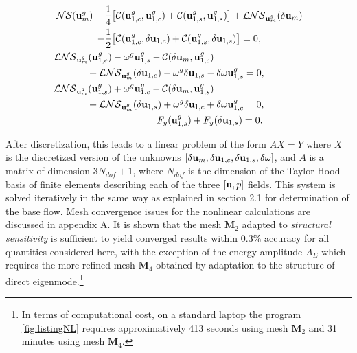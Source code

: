 \documentclass[twocolumn,10pt]{asme2ej}
\begin{document}
\begin{subequations}

\begin{align}
{\cal NS}(  {\bf u }_m^g ) - \frac{1}{4} &\big[ {\cal C}( {\bf u }_{1,c}^g,{\bf u }_{1,c}^g) +  {\cal C}( {\bf u }_{1,s}^g,{\bf u }_{1,s}^g) \big]+ {\cal LNS}_{{\bf u }_m^g}(\delta {\bf u }_m) \nonumber \\
-\frac{1}{2}& \big[ {\cal C}( {\bf u }_{1,c}^g,\delta {\bf u }_{1,c}) +  {\cal C}( {\bf u }_{1,s}^g,\delta {\bf u }_{1,s}) \big] = 0, \label{HB_1} \\
{\cal LNS}_{{\bf u }_m^g}( {\bf u }_{1,c}^g)& - \omega^g {\bf u }_{1,s}^g -  {\cal C}( \delta {\bf u }_{m}, {\bf u }_{1,c}^g) \nonumber \\
&\hspace{-0.9cm}+{\cal LNS}_{{\bf u }_m^g}( \delta {\bf u }_{1,c})  - \omega^g \delta {\bf u }_{1,s}  
 - \delta \omega {\bf u }_{1,s}^g = 0 , \label{HB_2}\\
{\cal LNS}_{{\bf u }_m^g}({\bf u }_{1,s}^g)& + \omega^g {\bf u }_{1,c}^g -  {\cal C}( \delta {\bf u }_{m}, {\bf u }_{1,s}^g) \nonumber \\
&\hspace{-0.9cm}+{\cal LNS}_{{\bf u }_m^g}( \delta {\bf u }_{1,s}) + \omega^g \delta {\bf u }_{1,c} +  \delta \omega {\bf u }_{1,c}^g= 0 , \label{HB_3} \\
&\hspace{1.65cm} F_y({\bf u }_{1,s}^g) + F_y(\delta {\bf u }_{1,s}) = 0. 
\end{align}
\end{subequations}

After discretization, this leads to a linear problem of the form $A X = Y$ where $X$ is the discretized version of the unknowns  $[\delta {\bf u }_m, \delta {\bf u }_{1,c}, \delta {\bf u }_{1,s}, \delta \omega]$, and $A$ is a matrix of dimension $3 N_{dof} +1$, where $N_{dof}$ is the dimension of the Taylor-Hood basis of finite elements describing each of the three $[{\bf u},p]$ fields.  This system is solved iteratively in the same way as explained in section 2.1 for determination of the base flow. %
Mesh convergence issues for the nonlinear calculations are discussed in appendix A. It is shown that the mesh $\mathbf{M}_2$ adapted to {\em structural sensitivity} is sufficient to yield converged results within $0.3\%$ accuracy for all quantities considered here, with the exception of the energy-amplitude $A_E$ which requires the more refined mesh $\mathbf{M}_4$ obtained by adaptation to the structure of direct eigenmode.\footnote{In terms of computational cost, on a standard laptop the program  \ref{fig:listingNL} requires approximatively 413 seconds using  mesh $\mathbf{M}_2$ and 31 minutes using mesh $\mathbf{M}_4$.} 
 
\end{document}
